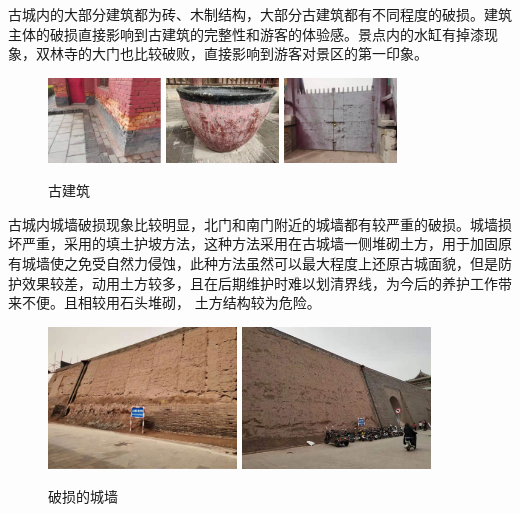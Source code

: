 \documentclass[UTF8]{ctexart}
\begin{document}
    古城内的大部分建筑都为砖、木制结构，大部分古建筑都有不同程度的破损。建筑主体的破损直接影响到古建筑的完整性和游客的体验感。景点内的水缸有掉漆现象，双林寺的大门也比较破败，直接影响到游客对景区的第一印象。
    \begin{figure}[H]
    \centering
    \includegraphics[width=3cm]{图片 19.png}
    \includegraphics[width=3cm]{图片 20.png}
    \includegraphics[width=3cm]{图片 21.png}
    \caption{古建筑}
    \label{fig:my_label}
    \end{figure}
    古城内城墙破损现象比较明显，北门和南门附近的城墙都有较严重的破损。城墙损坏严重，采用的填土护坡方法，这种方法采用在古城墙一侧堆砌土方，用于加固原有城墙使之免受自然力侵蚀，此种方法虽然可以最大程度上还原古城面貌，但是防护效果较差，动用土方较多，且在后期维护时难以划清界线，为今后的养护工作带来不便。且相较用石头堆砌， 土方结构较为危险。
    \begin{figure}[H]
    \centering
    \includegraphics[width=5cm]{图片 23.png}
    \includegraphics[width=5cm]{图片 24.png}
    \caption{破损的城墙}
    \label{fig:my_label}
    \end{figure}
\end{document}
